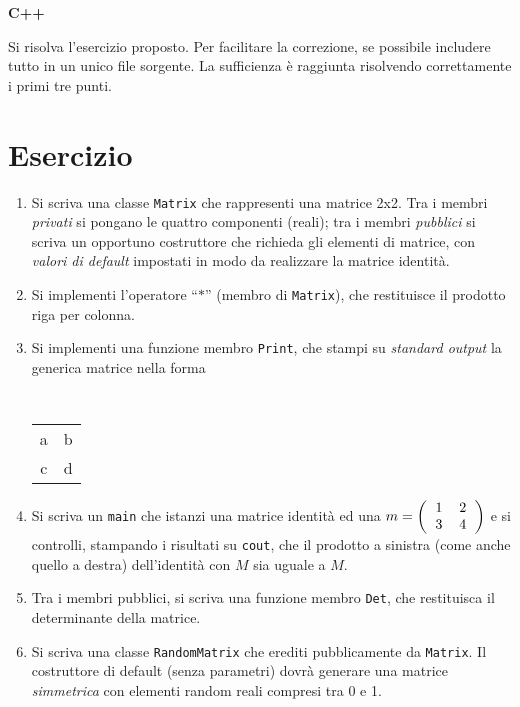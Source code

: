 \documentclass[12pt,italian]{article}
\begin{document}
\clearpage


\begin{center}
{\large\bf C++}
\end{center}

Si risolva l'esercizio proposto.
Per facilitare la correzione, se possibile includere tutto in un unico file sorgente.
La sufficienza \`e raggiunta risolvendo correttamente
i primi tre punti.



\section*{Esercizio}

\begin{enumerate}

\item
Si scriva una classe {\tt Matrix} che rappresenti una matrice 2x2.
Tra i membri \emph{privati} si pongano le quattro componenti (reali);
tra i membri \emph{pubblici} si scriva un opportuno costruttore
che richieda gli elementi di matrice, con \emph{valori di default}
impostati in modo da realizzare la matrice identit\`a.

\item
Si implementi l'operatore ``$*$'' (membro di {\tt Matrix}), che restituisce il prodotto riga per colonna.

\item
Si implementi una funzione membro {\tt Print},
che stampi su \emph{standard output} la generica matrice
nella forma
{
\tt
\begin{tabular}{cc}
a&b\\
c&d
\end{tabular}
}

\item
Si scriva un {\tt main} che istanzi una matrice
identit\`a ed una 
{$m=
\left(
\begin{tabular}{cc}
1&2\\
3&4
\end{tabular}
\right)$
}
e si controlli, stampando i risultati su {\tt cout},
che il prodotto a sinistra (come anche quello a destra) dell'identit\`a
con $M$ sia uguale a $M$.

\item
Tra i membri pubblici, si scriva una funzione membro {\tt Det},
che restituisca il determinante della matrice.

\item
Si scriva una classe {\tt RandomMatrix} che erediti pubblicamente
da {\tt Matrix}.
Il costruttore di default (senza parametri) dovr\`a generare una matrice \emph{simmetrica}
con elementi random reali compresi tra 0 e 1.


\end{enumerate}
\end{document}
